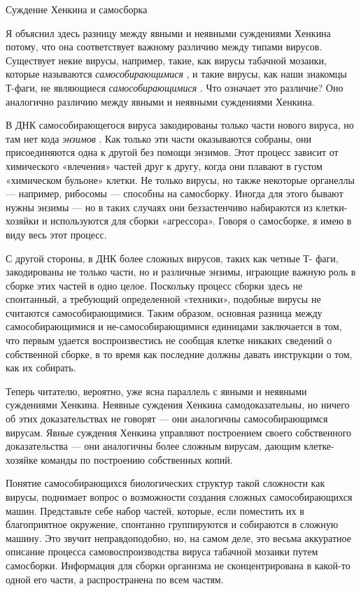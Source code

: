 \documentclass[../main.tex]{subfiles}
\begin{document}
Суждение Хенкина и самосборка

Я объяснил здесь разницу между явными и неявными суждениями Хенкина потому, что она соответствует важному различию между типами вирусов. Существует некие вирусы, например, такие, как вирусы табачной мозаики, которые называются \emph{самособирающимися} , и такие вирусы, как наши знакомцы Т-фаги, не являющиеся \emph{самособирающимися} . Что означает это различие? Оно аналогично различию между явными и неявными суждениями Хенкина.

В ДНК самособирающегося вируса закодированы только части нового вируса, но там нет кода \emph{энзимов} . Как только эти части оказываются собраны, они присоединяются одна к другой без помощи энзимов. Этот процесс зависит от химического «влечения» частей друг к другу, когда они плавают в густом «химическом бульоне» клетки. Не только вирусы, но также некоторые органеллы --- например, рибосомы --- способны на самосборку. Иногда для этого бывают нужны энзимы --- но в таких случаях они беззастенчиво набираются из клетки-хозяйки и используются для сборки «агрессора». Говоря о самосборке, я имею в виду весь этот процесс.

С другой стороны, в ДНК более сложных вирусов, таких как четные Т- фаги, закодированы не только части, но и различные энзимы, играющие важную роль в сборке этих частей в одно целое. Поскольку процесс сборки здесь не спонтанный, а требующий определенной «техники», подобные вирусы не считаются самособирающимися. Таким образом, основная разница между самособирающимися и не-самособирающимися единицами заключается в том, что первым удается воспроизвестись не сообщая клетке никаких сведений о собственной сборке, в то время как последние должны давать инструкции о том, как их собирать.

Теперь читателю, вероятно, уже ясна параллель с явными и неявными суждениями Хенкина. Неявные суждения Хенкина самодоказательны, но ничего об этих доказательствах не говорят --- они аналогичны самособирающимся вирусам. Явные суждения Хенкина управляют построением своего собственного доказательства --- они аналогичны более сложным вирусам, дающим клетке-хозяйке команды по построению собственных копий.

Понятие самособирающихся биологических структур такой сложности как вирусы, поднимает вопрос о возможности создания сложных самособирающихся машин. Представьте себе набор частей, которые, если поместить их в благоприятное окружение, спонтанно группируются и собираются в сложную машину. Это звучит неправдоподобно, но, на самом деле, это весьма аккуратное описание процесса самовоспроизводства вируса табачной мозаики путем самосборки. Информация для сборки организма не сконцентрирована в какой-то одной его части, а распространена по всем частям.
\end{document}
